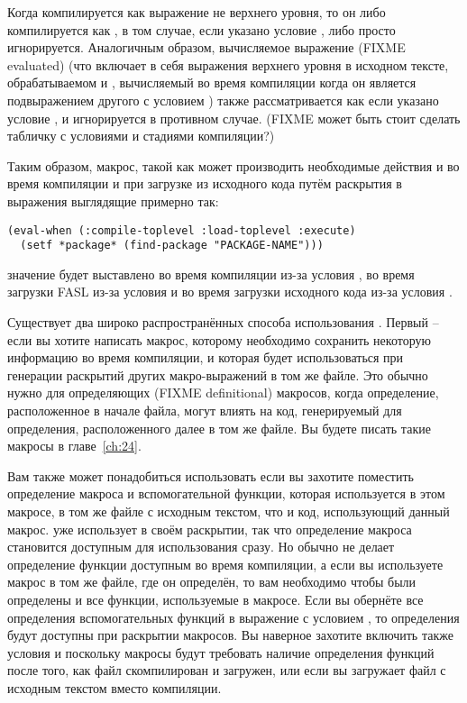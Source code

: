 Когда  компилируется как выражение не верхнего уровня, то он либо
компилируется как , в том случае, если указано условие , либо
просто игнорируется.  Аналогичным образом, вычисляемое выражение (FIXME evaluated)
 (что включает в себя выражения  верхнего уровня в
исходном тексте, обрабатываемом  и , вычисляемый во время
компиляции когда он является подвыражением другого  с условием
) также рассматривается как  если указано условие
, и игнорируется в противном случае. (FIXME может быть стоит сделать
табличку с условиями и стадиями компиляции?)

Таким образом, макрос, такой как  может производить необходимые действия
и во время компиляции и при загрузке из исходного кода путём раскрытия в выражения
 выглядящие примерно так:

\begin{lstlisting}
(eval-when (:compile-toplevel :load-toplevel :execute)
  (setf *package* (find-package "PACKAGE-NAME")))
\end{lstlisting}

значение  будет выставлено во время компиляции из-за условия
, во время загрузки FASL из-за условия  и во
время загрузки исходного кода из-за условия .

Существует два широко распространённых способа использования . Первый --
если вы хотите написать макрос, которому необходимо сохранить некоторую информацию во
время компиляции, и которая будет использоваться при генерации раскрытий других
макро-выражений в том же файле.  Это обычно нужно для определяющих (FIXME definitional)
макросов, когда определение, расположенное в начале файла, могут влиять на код,
генерируемый для определения, расположенного далее в том же файле.  Вы будете писать такие
макросы в главе~\ref{ch:24}.

Вам также может понадобиться использовать  если вы захотите поместить
определение макроса и вспомогательной функции, которая используется в этом макросе, в том
же файле с исходным текстом, что и код, использующий данный макрос.  уже
использует  в своём раскрытии, так что определение макроса становится
доступным для использования сразу.  Но обычно  не делает определение функции
доступным во время компиляции, а если вы используете макрос в том же файле, где он
определён, то вам необходимо чтобы были определены и все функции, используемые в
макросе. Если вы обернёте все определения вспомогательных функций в выражение
 с условием , то определения будут доступны при
раскрытии макросов. Вы наверное захотите включить также условия  и
 поскольку макросы будут требовать наличие определения функций после того,
как файл скомпилирован и загружен, или если вы загружает файл с исходным текстом вместо
компиляции.

